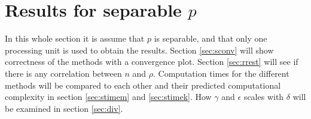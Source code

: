 \chapter{Results for separable $p$} \label{sec:seri}%
In this whole section it is assume that $p$ is separable, and that only one processing unit is used to obtain the results. 
Section \ref{sec:sconv} will show correctness of the methods with a convergence plot. Section \ref{sec:rrest} will see if there is any correlation between $n$ and $\rho$.
Computation times for the different methods will be compared to each other and their predicted computational complexity in section \ref{sec:stimem} and \ref{sec:stimek}.
How $\gamma$ and $\epsilon$ scales with $\delta$ will be examined in section \ref{sec:div}.
